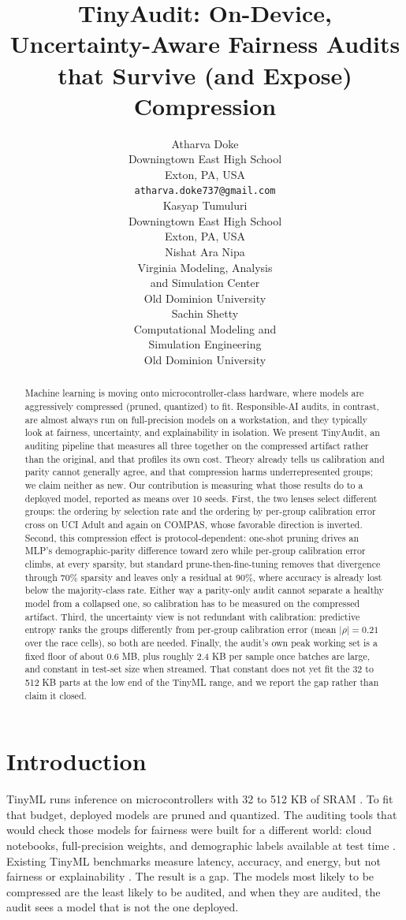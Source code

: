 \documentclass{article}
\title{TinyAudit: On-Device, Uncertainty-Aware Fairness Audits that Survive (and Expose) Compression}
\author{%
  Atharva Doke \\
  Downingtown East High School \\
  Exton, PA, USA \\
  \texttt{atharva.doke737@gmail.com} \\
  \And
  Kasyap Tumuluri \\
  Downingtown East High School \\
  Exton, PA, USA \\
  \AND
  Nishat Ara Nipa \\
  Virginia Modeling, Analysis \\ and Simulation Center \\
  Old Dominion University \\
  \And
  Sachin Shetty \\
  Computational Modeling and \\ Simulation Engineering \\
  Old Dominion University \\
}
\begin{document}
\maketitle

\begin{abstract}
Machine learning is moving onto microcontroller-class hardware, where models are aggressively compressed (pruned, quantized) to fit. Responsible-AI audits, in contrast, are almost always run on full-precision models on a workstation, and they typically look at fairness, uncertainty, and explainability in isolation. We present TinyAudit, an auditing pipeline that measures all three together on the compressed artifact rather than the original, and that profiles its own cost. Theory already tells us calibration and parity cannot generally agree, and that compression harms underrepresented groups; we claim neither as new. Our contribution is measuring what those results do to a deployed model, reported as means over 10 seeds. First, the two lenses select different groups: the ordering by selection rate and the ordering by per-group calibration error cross on UCI Adult and again on COMPAS, whose favorable direction is inverted. Second, this compression effect is protocol-dependent: one-shot pruning drives an MLP's demographic-parity difference toward zero while per-group calibration error climbs, at every sparsity, but standard prune-then-fine-tuning removes that divergence through 70\% sparsity and leaves only a residual at 90\%, where accuracy is already lost below the majority-class rate. Either way a parity-only audit cannot separate a healthy model from a collapsed one, so calibration has to be measured on the compressed artifact. Third, the uncertainty view is not redundant with calibration: predictive entropy ranks the groups differently from per-group calibration error (mean $|\rho| = 0.21$ over the race cells), so both are needed. Finally, the audit's own peak working set is a fixed floor of about 0.6 MB, plus roughly 2.4 KB per sample once batches are large, and constant in test-set size when streamed. That constant does not yet fit the 32 to 512 KB parts at the low end of the TinyML range, and we report the gap rather than claim it closed.
\end{abstract}

\section{Introduction}

TinyML runs inference on microcontrollers with 32 to 512 KB of SRAM \cite{somvanshi2025}. To fit that budget, deployed models are pruned and quantized. The auditing tools that would check those models for fairness were built for a different world: cloud notebooks, full-precision weights, and demographic labels available at test time \cite{lee2021,deng2022,han2024}. Existing TinyML benchmarks measure latency, accuracy, and energy, but not fairness or explainability \cite{somvanshi2025}. The result is a gap. The models most likely to be compressed are the least likely to be audited, and when they are audited, the audit sees a model that is not the one deployed.
\end{document}
